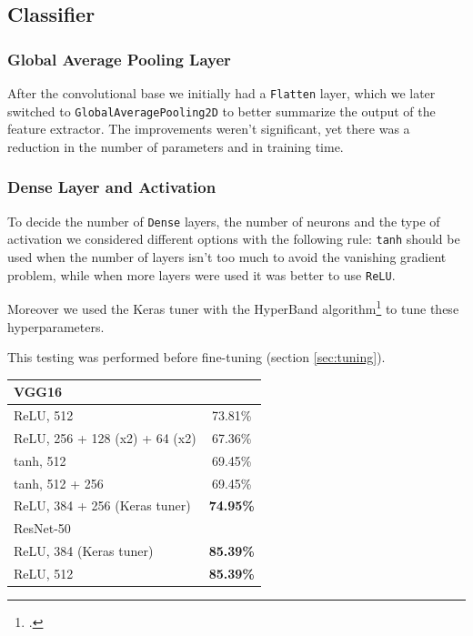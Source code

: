 \documentclass[conference,compsoc,11pt]{IEEEtran}
\begin{document}
\subsection{Classifier}

\subsubsection{Global Average Pooling Layer}

After the convolutional base we initially had a \verb|Flatten| layer, which we later switched to \verb|GlobalAveragePooling2D| to better summarize the output of the feature extractor. The improvements weren't significant, yet there was a reduction in the number of parameters and in training time.

\subsubsection{Dense Layer and Activation}

To decide the number of \verb|Dense| layers, the number of neurons and the type of activation we considered different options with the following rule: \verb|tanh| should be used when the number of layers isn't too much to avoid the vanishing gradient problem, while when more layers were used it was better to use \verb|ReLU|.

Moreover we used the Keras tuner with the HyperBand algorithm\footcite{hyperband} to tune these hyperparameters.

This testing was performed before fine-tuning (section \ref{sec:tuning}).

\begin{center}
\begin{tabular}{ l c }
\hline\hline
VGG16\\
\hline
ReLU, 512 & 73.81\% \\
ReLU, 256 + 128 (x2) + 64 (x2) & 67.36\% \\
tanh, 512 & 69.45\% \\
tanh, 512 + 256 & 69.45\% \\
ReLU, 384 + 256 (Keras tuner) & \textbf{74.95\%} \\
\hline\hline
ResNet-50\\
\hline
ReLU, 384 (Keras tuner) & \textbf{85.39\%}\\
ReLU, 512 & \textbf{85.39\%}\\
\hline\hline
\end{tabular}
\end{center}
\end{document}

